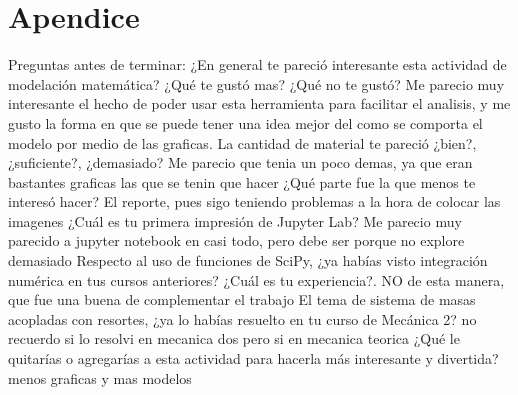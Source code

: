 \documentclass{article}
\begin{document}
\section{Apendice}

Preguntas antes de terminar:
\newline
¿En general te pareció interesante esta actividad de modelación matemática? ¿Qué te gustó mas? ¿Qué no te gustó?
\newline
Me parecio muy interesante el hecho de poder usar esta herramienta para facilitar el analisis, y me gusto la forma en que se puede tener una idea mejor del como se comporta el modelo por medio de las graficas.
\newline
La cantidad de material te pareció ¿bien?, ¿suficiente?, ¿demasiado?
\newline
Me parecio que tenia un poco demas, ya que eran bastantes graficas las que se tenin que hacer
\newline
¿Qué parte fue la que menos te interesó hacer?
\newline
El reporte, pues sigo teniendo problemas a la hora de colocar las imagenes
\newline
¿Cuál es tu primera impresión de Jupyter Lab?
\newline
Me parecio muy parecido a jupyter notebook en casi todo, pero debe ser porque no explore demasiado
\newline
Respecto al uso de funciones de SciPy, ¿ya habías visto integración numérica en tus cursos anteriores? ¿Cuál es tu experiencia?.
\newline
NO de esta manera, que fue una buena de complementar el trabajo
\newline
El tema de sistema de masas acopladas con resortes, ¿ya lo habías resuelto en tu curso de Mecánica 2?
\newline
no recuerdo si lo resolvi en mecanica dos pero si en mecanica teorica
\newline
¿Qué le quitarías o agregarías a esta actividad para hacerla más interesante y divertida?
\newline
menos graficas y mas modelos
\end{document}
